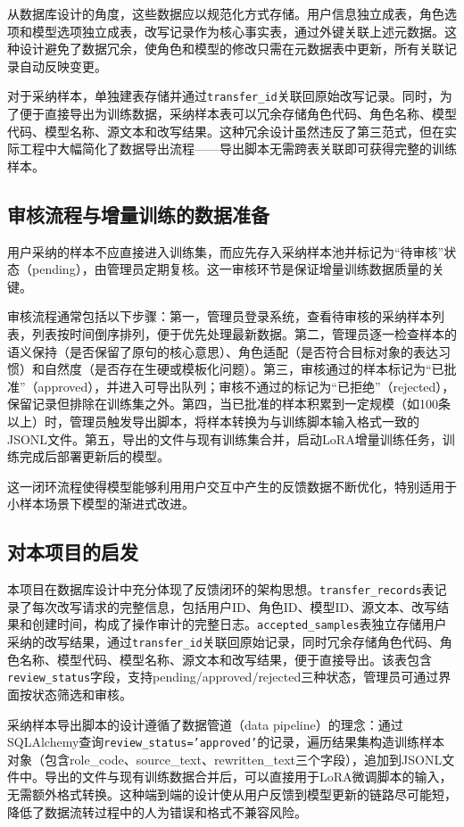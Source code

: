 \documentclass[12pt,a4paper]{ctexart}
\begin{document}
从数据库设计的角度，这些数据应以规范化方式存储。用户信息独立成表，角色选项和模型选项独立成表，改写记录作为核心事实表，通过外键关联上述元数据。这种设计避免了数据冗余，使角色和模型的修改只需在元数据表中更新，所有关联记录自动反映变更。

对于采纳样本，单独建表存储并通过\texttt{transfer\_id}关联回原始改写记录。同时，为了便于直接导出为训练数据，采纳样本表可以冗余存储角色代码、角色名称、模型代码、模型名称、源文本和改写结果。这种冗余设计虽然违反了第三范式，但在实际工程中大幅简化了数据导出流程——导出脚本无需跨表关联即可获得完整的训练样本。

\subsection{审核流程与增量训练的数据准备}

用户采纳的样本不应直接进入训练集，而应先存入采纳样本池并标记为“待审核”状态（pending），由管理员定期复核。这一审核环节是保证增量训练数据质量的关键。

审核流程通常包括以下步骤：第一，管理员登录系统，查看待审核的采纳样本列表，列表按时间倒序排列，便于优先处理最新数据。第二，管理员逐一检查样本的语义保持（是否保留了原句的核心意思）、角色适配（是否符合目标对象的表达习惯）和自然度（是否存在生硬或模板化问题）。第三，审核通过的样本标记为“已批准”（approved），并进入可导出队列；审核不通过的标记为“已拒绝”（rejected），保留记录但排除在训练集之外。第四，当已批准的样本积累到一定规模（如100条以上）时，管理员触发导出脚本，将样本转换为与训练脚本输入格式一致的JSONL文件。第五，导出的文件与现有训练集合并，启动LoRA增量训练任务，训练完成后部署更新后的模型。

这一闭环流程使得模型能够利用用户交互中产生的反馈数据不断优化，特别适用于小样本场景下模型的渐进式改进。

\subsection{对本项目的启发}

本项目在数据库设计中充分体现了反馈闭环的架构思想。\texttt{transfer\_records}表记录了每次改写请求的完整信息，包括用户ID、角色ID、模型ID、源文本、改写结果和创建时间，构成了操作审计的完整日志。\texttt{accepted\_samples}表独立存储用户采纳的改写结果，通过\texttt{transfer\_id}关联回原始记录，同时冗余存储角色代码、角色名称、模型代码、模型名称、源文本和改写结果，便于直接导出。该表包含\texttt{review\_status}字段，支持pending/approved/rejected三种状态，管理员可通过界面按状态筛选和审核。

采纳样本导出脚本的设计遵循了数据管道（data pipeline）的理念：通过SQLAlchemy查询\texttt{review\_status='approved'}的记录，遍历结果集构造训练样本对象（包含role\_code、source\_text、rewritten\_text三个字段），追加到JSONL文件中。导出的文件与现有训练数据合并后，可以直接用于LoRA微调脚本的输入，无需额外格式转换。这种端到端的设计使从用户反馈到模型更新的链路尽可能短，降低了数据流转过程中的人为错误和格式不兼容风险。
\end{document}
